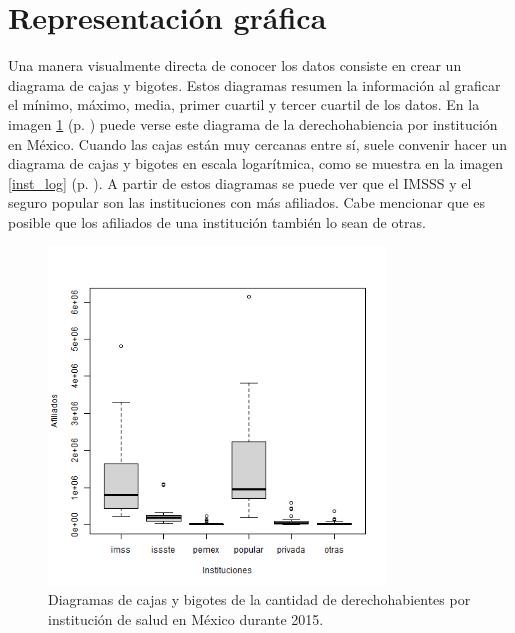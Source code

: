 \documentclass[paper=leter, fontsize=11pt]{scrartcl}
\numberwithin{equation}{section}		%
\numberwithin{figure}{section}			%
\numberwithin{table}{section}				%
\begin{document}
\section{Representación gráfica}

Una manera visualmente directa de conocer los datos consiste en crear un diagrama de cajas y bigotes. Estos diagramas resumen la información al graficar el mínimo, máximo, media, primer cuartil y tercer cuartil de los datos. En la imagen \ref{inst} (p. \pageref{inst}) puede verse este diagrama de la derechohabiencia por institución en México. Cuando las cajas están muy cercanas entre sí, suele convenir hacer un diagrama de cajas y bigotes en escala logarítmica, como se muestra en la imagen \ref{inst_log} (p. \pageref{inst_log}). A partir de estos diagramas se puede ver que el IMSSS y el seguro popular son las instituciones con más afiliados. Cabe mencionar que es posible que los afiliados de una institución también lo sean de otras.

\begin{figure}
    \centering
    \includegraphics[width=0.8\textwidth]{inst.png}
    \caption{Diagramas de cajas y bigotes de la cantidad de derechohabientes por institución de salud en México durante 2015.}
    \label{inst}
\end{figure}
\end{document}
